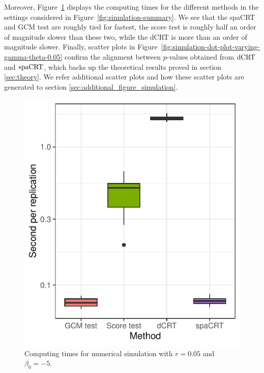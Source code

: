 \documentclass[12pt]{article}
\theoremstyle{definition}
\newcommand{\dCRT}{\textnormal{dCRT}} 					%
\newcommand{\spacrt}{\textnormal{spaCRT}}               %
\begin{document}
Moreover, Figure~\ref{fig:simulation-computing-times} displays the computing times for the different methods in the settings considered in Figure~\ref{fig:simulation-summary}. We see that the spaCRT and GCM test are roughly tied for fastest, the score test is roughly half an order of magnitude slower than these two, while the dCRT is more than an order of magnitude slower. {\color{red} Finally, scatter plots in Figure~\ref{fig:simulation-dot-plot-varying-gamma-theta-0.05} confirm the alignment between $p$-values obtained from $\dCRT$ and $\spacrt$, which backs up the theoretical results proved in section \ref{sec:theory}. We refer additional scatter plots and how these scatter plots are generated to section \ref{sec:additional_figure_simulation}.}


\begin{figure}[h!]
	\centering
	\includegraphics{figures-and-tables/simulation-computing-times.pdf}
	\caption{Computing times for numerical simulation with $r = 0.05$ and $\beta_0 = -5$.}
	\label{fig:simulation-computing-times}
\end{figure}
\end{document}
